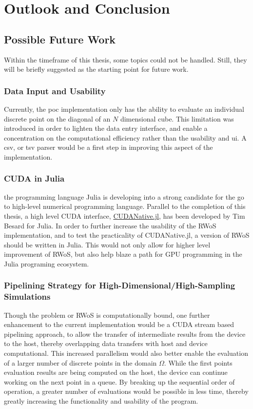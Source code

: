 \chapter{Outlook and Conclusion}
\label{chapter:outlook_and_conclusion}
\section{Possible Future Work}
Within the timeframe of this thesis, some topics could not be handled.  Still,
they will be briefly suggested as the starting point for future work.
\subsection{Data Input and Usability}
Currently, the \gls{poc} implementation only has the ability to evaluate an individual discrete point
on the diagonal of an $N$ dimensional cube.  This limitation was introduced in order
to lighten the data entry interface, and enable a concentration on the computational
efficiency rather than the usability and \gls{ui}.  A csv, or tsv parser would be a first step in
improving this aspect of the implementation.
\subsection{CUDA in Julia}
the programming language Julia is developing into a strong candidate for the go
to high-level numerical programming language.  Parallel to the completion of this
thesis, a high level CUDA interface, \href{https://github.com/JuliaGPU/CUDAnative.jl}
{CUDANative.jl}, has been developed by Tim Besard for Julia. In order to further increase the
usability of the \Gls{RWoS} implementation, and to test the practicality of CUDANative.jl,
a version of \Gls{RWoS} should be written in Julia.  This would not only allow
for higher level improvement of \Gls{RWoS}, but also help blaze a path for
GPU programming in the Julia programing ecosystem.

\subsection{Pipelining Strategy for High-Dimensional/High-Sampling Simulations}
Though the problem or \Gls{RWoS} is computationally bound, one further enhancement
to the current implementation would be a CUDA stream based pipelining approach,
to allow the transfer of intermediate results from the device to the host,
thereby overlapping data transfers with host and device computational.  This increased
parallelism would also better enable the evaluation of a larger number of discrete
 points in the domain $\Omega$.  While the first points evaluation results are being
 computed on the host, the device can continue working on the next point in a queue.
 By breaking up the sequential order of operation, a greater number of evaluations
 would be possible in less time, thereby greatly increasing the functionality and
 usability of the program.
